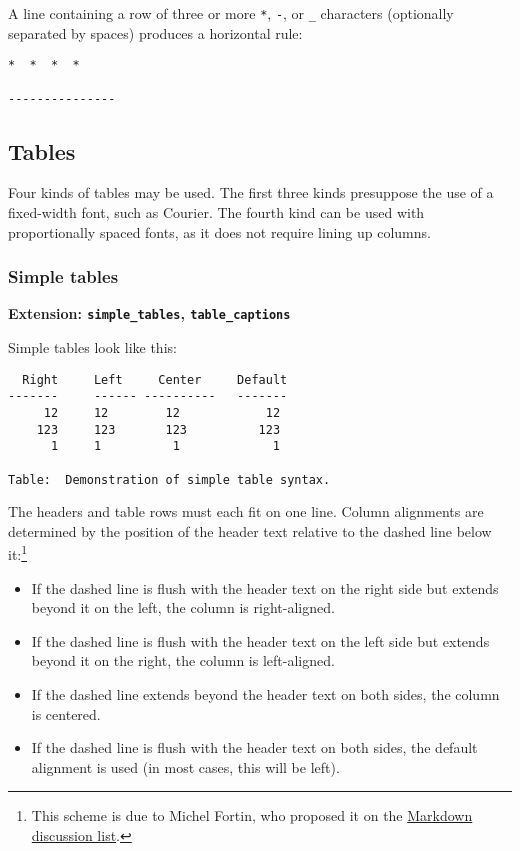 \documentclass[]{article}
\begin{document}
A line containing a row of three or more \texttt{*}, \texttt{-}, or
\texttt{\_} characters (optionally separated by spaces) produces a
horizontal rule:

\begin{verbatim}
*  *  *  *

---------------
\end{verbatim}

\subsection{Tables}

Four kinds of tables may be used. The first three kinds presuppose the
use of a fixed-width font, such as Courier. The fourth kind can be used
with proportionally spaced fonts, as it does not require lining up
columns.

\subsubsection{Simple tables}

\textbf{Extension: \texttt{simple\_tables}, \texttt{table\_captions}}

Simple tables look like this:

\begin{verbatim}
  Right     Left     Center     Default
-------     ------ ----------   -------
     12     12        12            12
    123     123       123          123
      1     1          1             1

Table:  Demonstration of simple table syntax.
\end{verbatim}

The headers and table rows must each fit on one line. Column alignments
are determined by the position of the header text relative to the dashed
line below it:\footnote{This scheme is due to Michel Fortin, who
  proposed it on the
  \href{http://six.pairlist.net/pipermail/markdown-discuss/2005-March/001097.html}{Markdown
  discussion list}.}

\begin{itemize}
\itemsep1pt\parskip0pt
\item
  If the dashed line is flush with the header text on the right side but
  extends beyond it on the left, the column is right-aligned.
\item
  If the dashed line is flush with the header text on the left side but
  extends beyond it on the right, the column is left-aligned.
\item
  If the dashed line extends beyond the header text on both sides, the
  column is centered.
\item
  If the dashed line is flush with the header text on both sides, the
  default alignment is used (in most cases, this will be left).
\end{itemize}
\end{document}
